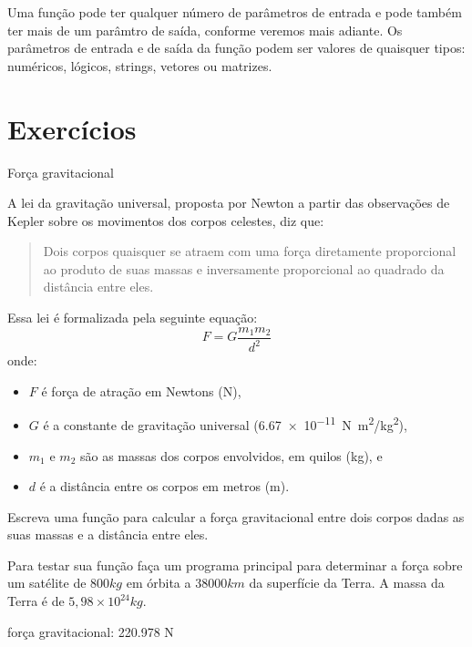 \documentclass[11pt]{practice}
\begin{document}
Uma função pode ter qualquer número de parâmetros de entrada e pode
também ter mais de um parâmtro de saída, conforme veremos mais
adiante. Os parâmetros de entrada e de saída da função podem ser valores
de quaisquer tipos: numéricos, lógicos, strings, vetores ou matrizes.


\section{Exercícios}

\begin{task}[breakable]{Força gravitacional}{}

  A lei da gravitação universal, proposta por Newton a partir das
  observações de Kepler sobre os movimentos dos corpos celestes, diz
  que:
  \begin{quote}
    Dois corpos quaisquer se atraem com uma força diretamente
    proporcional ao produto de suas massas e inversamente proporcional
    ao quadrado da distância entre eles.
  \end{quote}
  Essa lei é formalizada pela seguinte equação:
  \begin{equation*}
    F = G \frac{m_1 m_2}{d^2}
  \end{equation*}
  onde:
  \begin{itemize}
    \item $F$ é força de atração em Newtons (\si{N}),
    \item $G$ é a constante de gravitação universal (\SI{6,67e-11}{N. m^2/kg^2}),
    \item $m_1$ e $m_2$ são as massas dos corpos envolvidos, em quilos (\si{kg}), e
    \item $d$ é a distância entre os corpos em metros (\si{m}).
  \end{itemize}

  Escreva uma função para calcular a força gravitacional entre dois
  corpos dadas as suas massas e a distância entre eles.

  Para testar sua função faça um programa principal para determinar a
  força sobre um satélite de $800 kg$ em órbita a $38000 km$ da
  superfície da Terra. A massa da Terra é de $5,98 \times 10^{24} kg$.

  \begin{runexample}
força gravitacional: 220.978 N
  \end{runexample}

  \tcblower
  \solution
\end{task}
\end{document}
